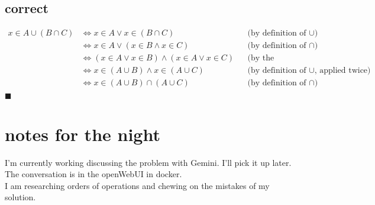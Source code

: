 \documentclass{scrartcl}
\begin{document}
    \subsection*{correct}
    \begin{align*}
        x \in A \cup (B \cap C)
        &\Leftrightarrow x \in A \vee x \in (B \cap C)
        && \text{(by definition of $\cup$)} \\
        &\Leftrightarrow x \in A \vee (x \in B \wedge x \in C)
        && \text{(by definition of $\cap$)} \\
        &\Leftrightarrow (x \in A \vee x \in B) \wedge (x \in A \vee x \in C)
        && \text{(by the Distributive Law)} \\
        &\Leftrightarrow x \in (A \cup B) \wedge x \in (A \cup C)
        && \text{(by definition of $\cup$, applied twice)} \\
        &\Leftrightarrow x \in (A \cup B) \cap (A \cup C)
        && \text{(by definition of $\cap$)} \\
    \end{align*}
    \hfill $\blacksquare$

    \section*{notes for the night}
    I'm currently working discussing the problem with Gemini. I'll pick it up later. The conversation is in the openWebUI in docker.\\
    I am researching orders of operations and chewing on the mistakes of my solution.
\end{document}
